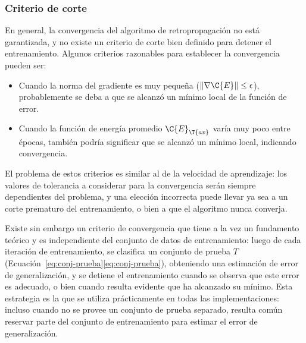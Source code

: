 \subsubsection{Criterio de corte}
%
En general, la convergencia del algoritmo de retropropagación no está
garantizada, y no existe un criterio de corte bien definido para
detener el entrenamiento. Algunos criterios razonables para establecer
la convergencia pueden ser:
%
\begin{itemize}
\item Cuando la norma del gradiente es muy pequeña
  ($\|\nabla\C{E}\|\leq\epsilon$), probablemente se deba a que se
  alcanzó un mínimo local de la función de error.
\item Cuando la función de energía promedio $\C{E}_{\T{av}}$ varía muy
  poco entre épocas, también podría significar que se alcanzó un
  mínimo local, indicando convergencia.
\end{itemize}
%
El problema de estos criterios es similar al de la velocidad de
aprendizaje: los valores de tolerancia a considerar para la
convergencia serán siempre dependientes del problema, y una elección
incorrecta puede llevar ya sea a un corte prematuro del entrenamiento,
o bien a que el algoritmo nunca converja.

Existe sin embargo un criterio de convergencia que tiene a la vez un
fundamento teórico y es independiente del conjunto de datos de
entrenamiento: luego de cada iteración de entrenamiento, se clasifica
un conjunto de prueba $T$
(\iflatexml{}Ecuación~\ref{eq:conj-prueba}\else\autoref{eq:conj-prueba}\fi),
obteniendo una estimación de error de generalización, y se detiene el
entrenamiento cuando se observa que este error es adecuado, o bien
cuando resulta evidente que ha alcanzado su mínimo. Esta estrategia es
la que se utiliza prácticamente en todas las implementaciones: incluso
cuando no se provee un conjunto de prueba separado, resulta común
reservar parte del conjunto de entrenamiento para estimar el error de
generalización.
